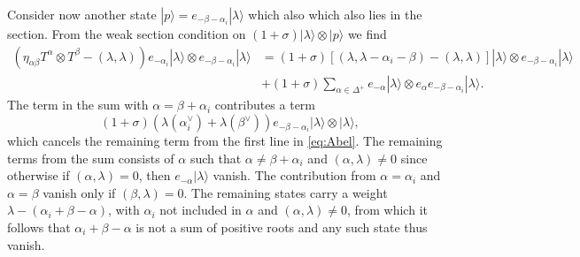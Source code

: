 Consider now another state $|p\rangle = e_{-\beta-\alpha_i}|\lambda\rangle$ which also which also lies in the section. From the weak section condition on $(1+\sigma)|\lambda\rangle\otimes|p\rangle$ we find 
\begin{equation}\label{eq:Abel}
    \begin{aligned}
        \left(\eta_{\alpha\beta}T^\alpha\otimes T^\beta-(\lambda,\lambda)\right)e_{-\alpha_i}|\lambda\rangle \otimes e_{-\beta-\alpha_i}|\lambda\rangle &= (1+\sigma)\left[(\lambda,\lambda-\alpha_i-\beta)-(\lambda,\lambda)\right]|\lambda\rangle\otimes e_{-\beta-\alpha_i}|\lambda\rangle \\
        &+(1+\sigma)\sum_{\alpha\in \Delta^+}e_{-\alpha}|\lambda\rangle\otimes e_{\alpha}e_{-\beta-\alpha_i}|\lambda\rangle.
    \end{aligned}
\end{equation}
The term in the sum with $\alpha=\beta+\alpha_i$ contributes a term 
\begin{equation}
    (1+\sigma)(\lambda(\alpha_i^\vee)+\lambda(\beta^\vee))e_{-\beta-\alpha_i}|\lambda\rangle\otimes|\lambda\rangle,
\end{equation}
which cancels the remaining term from the first line in \eqref{eq:Abel}. The remaining terms from the sum consists of $\alpha$ such that $\alpha\neq \beta+\alpha_i$ and $(\alpha,\lambda)\neq 0$ since otherwise if $(\alpha,\lambda)=0$, then $e_{-\alpha}|\lambda\rangle$ vanish. The contribution from $\alpha=\alpha_i$ and $\alpha=\beta$ vanish only if $(\beta,\lambda)=0$. The remaining states carry a weight $\lambda-(\alpha_i+\beta-\alpha)$, with $\alpha_i$ not included in $\alpha$ and $(\alpha,\lambda)\neq 0$, from which it follows that $\alpha_i+\beta-\alpha$ is not a sum of positive roots and any such state thus vanish. 

